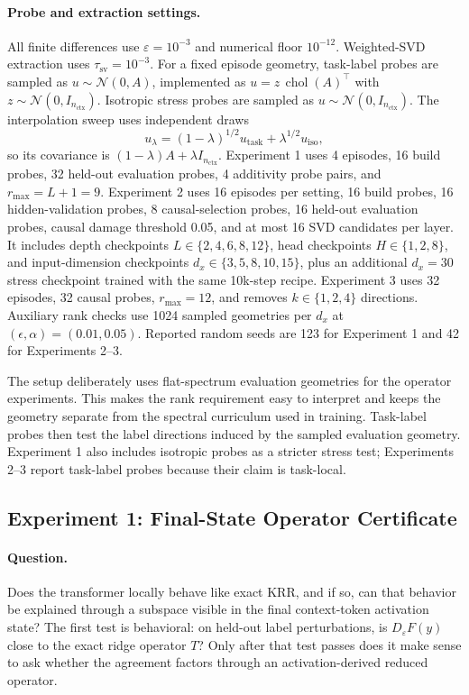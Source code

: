 \documentclass[11pt]{article}
\newcommand{\chol}{\operatorname{chol}}
\begin{document}
\paragraph{Probe and extraction settings.}
All finite differences use \(\varepsilon=10^{-3}\) and numerical floor \(10^{-12}\). Weighted-SVD
extraction uses \(\tau_{\mathrm{sv}}=10^{-3}\). For a fixed episode geometry, task-label probes are
sampled as \(u\sim\mathcal{N}(0,A)\), implemented as \(u=z\,\chol(A)^\top\) with
\(z\sim\mathcal{N}(0,I_{n_{\mathrm{ctx}}})\). Isotropic stress probes are sampled as
\(u\sim\mathcal{N}(0,I_{n_{\mathrm{ctx}}})\). The interpolation sweep uses independent draws
\[
u_\lambda=(1-\lambda)^{1/2}u_{\mathrm{task}}+\lambda^{1/2}u_{\mathrm{iso}},
\]
so its covariance is \((1-\lambda)A+\lambda I_{n_{\mathrm{ctx}}}\). Experiment 1 uses 4 episodes,
16 build probes, 32 held-out evaluation probes, 4 additivity probe pairs, and \(r_{\max}=L+1=9\).
Experiment 2 uses 16 episodes per setting, 16 build probes, 16 hidden-validation probes,
8 causal-selection probes, 16 held-out evaluation probes, causal damage threshold 0.05, and at
most 16 SVD candidates per layer. It includes depth checkpoints \(L\in\{2,4,6,8,12\}\), head
checkpoints \(H\in\{1,2,8\}\), and input-dimension checkpoints
\(d_x\in\{3,5,8,10,15\}\), plus an additional \(d_x=30\) stress checkpoint trained with the same
10k-step recipe. Experiment 3 uses 32 episodes, 32 causal probes, \(r_{\max}=12\), and
removes \(k\in\{1,2,4\}\) directions. Auxiliary rank checks use 1024 sampled geometries per
\(d_x\) at \((\epsilon,\alpha)=(0.01,0.05)\). Reported random seeds are 123 for Experiment 1 and
42 for Experiments 2--3.

The setup deliberately uses flat-spectrum evaluation geometries for the operator experiments.
This makes the rank requirement easy to interpret and keeps the geometry separate from the
spectral curriculum used in training. Task-label probes then test the label directions induced by
the sampled evaluation geometry. Experiment 1 also includes isotropic probes as a stricter stress
test; Experiments 2--3 report task-label probes because their claim is task-local.

\subsection{Experiment 1: Final-State Operator Certificate}

\paragraph{Question.}
Does the transformer locally behave like exact KRR, and if so, can that behavior be explained
through a subspace visible in the final context-token activation state? The first test is behavioral:
on held-out label perturbations, is \(D_\varepsilon F(y)\) close to the exact ridge operator \(T\)?
Only after that test passes does it make sense to ask whether the agreement factors through an
activation-derived reduced operator.
\end{document}
